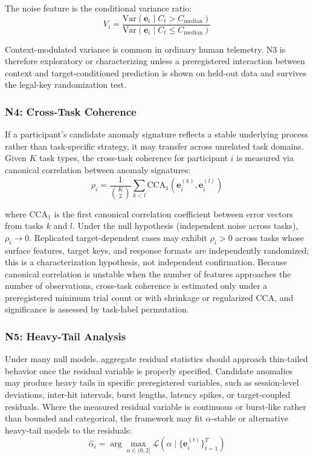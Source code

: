 \documentclass[11pt,letterpaper]{article}
\begin{document}
The noise feature is the conditional variance ratio:
\begin{equation}
V_i = \frac{\text{Var}(\mathbf{e}_i \mid C_t > C_{\text{median}})}{\text{Var}(\mathbf{e}_i \mid C_t \leq C_{\text{median}})}
\end{equation}

Context-modulated variance is common in ordinary human telemetry. N3 is therefore exploratory or characterizing unless a preregistered interaction between context and target-conditioned prediction is shown on held-out data and survives the legal-key randomization test.

\subsubsection{N4: Cross-Task Coherence}

If a participant's candidate anomaly signature reflects a stable underlying process rather than task-specific strategy, it may transfer across unrelated task domains. Given $K$ task types, the cross-task coherence for participant $i$ is measured via canonical correlation between anomaly signatures:
\begin{equation}
\rho_i = \frac{1}{\binom{K}{2}} \sum_{k < l} \text{CCA}_1(\mathbf{e}_i^{(k)}, \mathbf{e}_i^{(l)})
\end{equation}

where $\text{CCA}_1$ is the first canonical correlation coefficient between error vectors from tasks $k$ and $l$. Under the null hypothesis (independent noise across tasks), $\rho_i \to 0$. Replicated target-dependent cases may exhibit $\rho_i > 0$ across tasks whose surface features, target keys, and response formats are independently randomized; this is a characterization hypothesis, not independent confirmation. Because canonical correlation is unstable when the number of features approaches the number of observations, cross-task coherence is estimated only under a preregistered minimum trial count or with shrinkage or regularized CCA, and significance is assessed by task-label permutation.

\subsubsection{N5: Heavy-Tail Analysis}

Under many null models, aggregate residual statistics should approach thin-tailed behavior once the residual variable is properly specified. Candidate anomalies may produce heavy tails in specific preregistered variables, such as session-level deviations, inter-hit intervals, burst lengths, latency spikes, or target-coupled residuals. Where the measured residual variable is continuous or burst-like rather than bounded and categorical, the framework may fit $\alpha$-stable or alternative heavy-tail models \cite{nolan2020} to the residuals:
\begin{equation}
\hat{\alpha}_i = \arg\max_{\alpha \in (0, 2]} \mathcal{L}(\alpha \mid \{\mathbf{e}_i^{(t)}\}_{t=1}^{T})
\end{equation}
\end{document}
